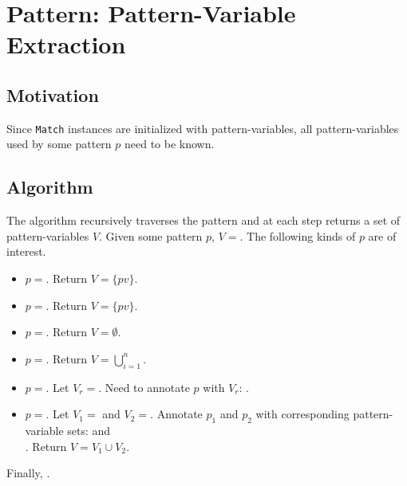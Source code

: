 \section{Pattern: Pattern-Variable Extraction}
\label{section:pv-extraction}

\subsection{Motivation}
Since \texttt{Match} instances are initialized with pattern-variables, all pattern-variables used by some pattern $p$ need to be known. 

\subsection{Algorithm}
The algorithm recursively traverses the pattern and at each step returns a set of pattern-variables $V$. Given some pattern $p$, $V=$\space {}. The following kinds of $p$ are of interest.

\begin{itemize}
\item $p=$\space \NonTerminal. Return $V = \{ pv \}$.
\item $p=$\space \BuiltInPattern. Return $V=\{ pv \}$.
\item $p=$\space \LiteralPattern. Return $V=\emptyset$.
\item $p=$\space \PatternSequence. Return $V=\bigcup_{i=1}^{n}$.
\item $p=$\space \PatternRepeat. Let $V_r=$\space{}. Need to annotate $p$ with $V_r$: .
\item $p=$\space \PatternInHole. Let $V_1=$\space{} and  $V_2=$\space{}. Annotate $p_1$ and $p_2$ with corresponding pattern-variable sets:  and \\ . Return $V = V_1 \cup V_2$.
\end{itemize}

Finally, .
